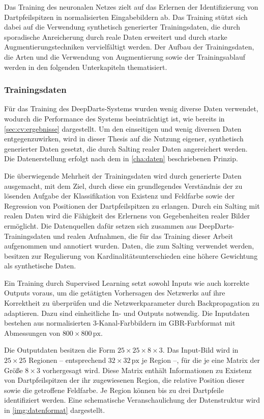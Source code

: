 Das Training des neuronalen Netzes zielt auf das Erlernen der Identifizierung von Dartpfeilspitzen in normalisierten Eingabebildern ab. Das Training stützt sich dabei auf die Verwendung synthetisch generierter Trainingsdaten, die durch sporadische Anreicherung durch reale Daten erweitert und durch starke Augmentierungstechniken vervielfältigt werden. Der Aufbau der Trainingsdaten, die Arten und die Verwendung von Augmentierung sowie der Trainingsablauf werden in den folgenden Unterkapiteln thematisiert.

\subsubsection{Trainingsdaten}
\label{sec:trainingsdaten}

Für das Training des DeepDarts-Systems wurden wenig diverse Daten verwendet, wodurch die Performance des Systems beeinträchtigt ist, wie bereits in \autoref{sec:cv:ergebnisse} dargestellt. Um den einseitigen und wenig diversen Daten entgegenzuwirken, wird in dieser Thesis auf die Nutzung eigener, synthetisch generierter Daten gesetzt, die durch Salting realer Daten angereichert werden. Die Datenerstellung erfolgt nach dem in \autoref{cha:daten} beschriebenen Prinzip.

Die überwiegende Mehrheit der Trainingsdaten wird durch generierte Daten ausgemacht, mit dem Ziel, durch diese ein grundlegendes Verständnis der zu lösenden Aufgabe der Klassifikation von Existenz und Feldfarbe sowie der Regression von Positionen der Dartpfeilspitzen zu erlangen. Durch ein Salting mit realen Daten wird die Fähigkeit des Erlernens von Gegebenheiten realer Bilder ermöglicht. Die Datenquellen dafür setzen sich zusammen aus DeepDarts-Trainingsdaten und realen Aufnahmen, die für das Training dieser Arbeit aufgenommen und annotiert wurden. Daten, die zum Salting verwendet werden, besitzen zur Regulierung von Kardinalitätsunterschieden eine höhere Gewichtung als synthetische Daten.

Ein Training durch Supervised Learning setzt sowohl Inputs wie auch korrekte Outputs voraus, um die getätigten Vorhersagen des Netzwerks auf ihre Korrektheit zu überprüfen und die Netzwerkparameter durch Backpropagation zu adaptieren. Dazu sind einheitliche In- und Outputs notwendig. Die Inputdaten bestehen aus normalisierten 3-Kanal-Farbbildern im GBR-Farbformat mit Abmessungen von $800 \times 800\,\text{px}$.

Die Outputdaten besitzen die Form $25 \times 25 \times 8 \times 3$. Das Input-Bild wird in $25 \times 25$ Regionen -- entsprechend $32 \times 32\,\text{px}$ je Region --, für die je eine Matrix der Größe $8 \times 3$ vorhergesagt wird. Diese Matrix enthält Informationen zu Existenz von Dartpfeilspitzen der ihr zugewiesenen Region, die relative Position dieser sowie die getroffene Feldfarbe. Je Region können bis zu drei Dartpfeile identifiziert werden. Eine schematische Veranschaulichung der Datenstruktur wird in \autoref{img:datenformat} dargestellt.

